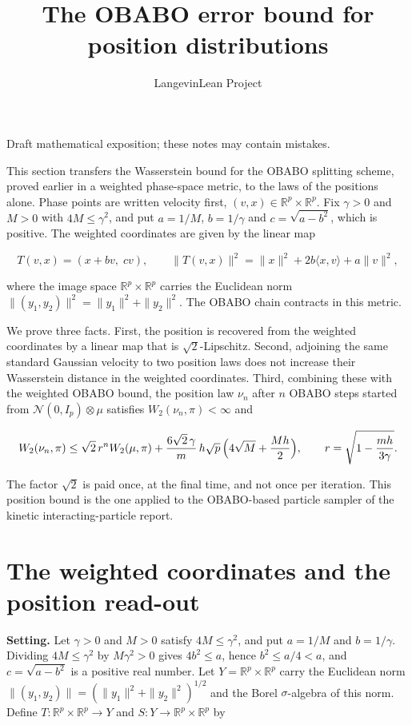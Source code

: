 \documentclass[11pt,a4paper]{article}
\title{\texorpdfstring{The OBABO error bound for position distributions}{The OBABO error bound for position distributions}}
\author{LangevinLean Project}
\date{}
\begin{document}
\maketitle
Draft mathematical exposition; these notes may contain mistakes.


This section transfers the Wasserstein bound for the OBABO splitting scheme, proved earlier in a weighted phase-space metric, to the laws of the positions alone. Phase points are written velocity first, \((v,x)\in\mathbb R^p\times\mathbb R^p\). Fix \(\gamma>0\) and \(M>0\) with \(4M\le\gamma^2\), and put \(a=1/M\), \(b=1/\gamma\) and \(c=\sqrt{a-b^2}\), which is positive. The weighted coordinates are given by the linear map


\[T(v,x)=(x+bv,\;cv),\qquad \|T(v,x)\|^2=\|x\|^2+2b\langle x,v\rangle+a\|v\|^2,\]


where the image space \(\mathbb R^p\times\mathbb R^p\) carries the Euclidean norm \(\|(y_1,y_2)\|^2=\|y_1\|^2+\|y_2\|^2\). The OBABO chain contracts in this metric.




We prove three facts. First, the position is recovered from the weighted coordinates by a linear map that is \(\sqrt2\)-Lipschitz. Second, adjoining the same standard Gaussian velocity to two position laws does not increase their Wasserstein distance in the weighted coordinates. Third, combining these with the weighted OBABO bound, the position law \(\nu_n\) after \(n\) OBABO steps started from \(\mathcal N(0,I_p)\otimes\mu\) satisfies \(W_2(\nu_n,\pi)<\infty\) and


\[W_2(\nu_n,\pi)\le\sqrt2\,r^nW_2(\mu,\pi)+\frac{6\sqrt2\,\gamma}{m}\,h\sqrt p\,\Bigl(4\sqrt M+\frac{Mh}{2}\Bigr),\qquad r=\sqrt{1-\frac{mh}{3\gamma}}.\]


The factor \(\sqrt2\) is paid once, at the final time, and not once per iteration. This position bound is the one applied to the OBABO-based particle sampler of the kinetic interacting-particle report.


\section{\texorpdfstring{The weighted coordinates and the position read-out}{The weighted coordinates and the position read-out}}


\textbf{Setting.} Let \(\gamma>0\) and \(M>0\) satisfy \(4M\le\gamma^2\), and put \(a=1/M\) and \(b=1/\gamma\). Dividing \(4M\le\gamma^2\) by \(M\gamma^2>0\) gives \(4b^2\le a\), hence \(b^2\le a/4<a\), and \(c=\sqrt{a-b^2}\) is a positive real number. Let \(Y=\mathbb R^p\times\mathbb R^p\) carry the Euclidean norm \(\|(y_1,y_2)\|=(\|y_1\|^2+\|y_2\|^2)^{1/2}\) and the Borel \(\sigma\)-algebra of this norm. Define \(T:\mathbb R^p\times\mathbb R^p\to Y\) and \(S:Y\to\mathbb R^p\times\mathbb R^p\) by
\end{document}
